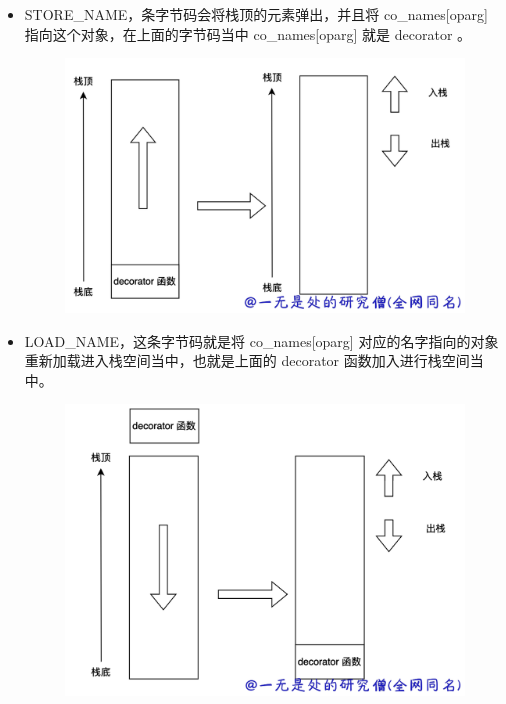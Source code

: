 \begin{itemize}
\item STORE\_NAME，条字节码会将栈顶的元素弹出，并且将 co\_names[oparg]  指向这个对象，在上面的字节码当中 co\_names[oparg]  就是 decorator 。 

    \begin{figure}[H]
        \centering
            \includegraphics[scale=.25]{images/50-bytecode.png}
						\caption{ }
        \label{fig:my_label}
    \end{figure}
    
\item LOAD\_NAME，这条字节码就是将 co\_names[oparg] 对应的名字指向的对象重新加载进入栈空间当中，也就是上面的 decorator 函数加入进行栈空间当中。 

    \begin{figure}[H]
        \centering
            \includegraphics[scale=.25]{images/51-bytecode.png}
						\caption{ }
        \label{fig:my_label}
    \end{figure}
    

\end{itemize}

